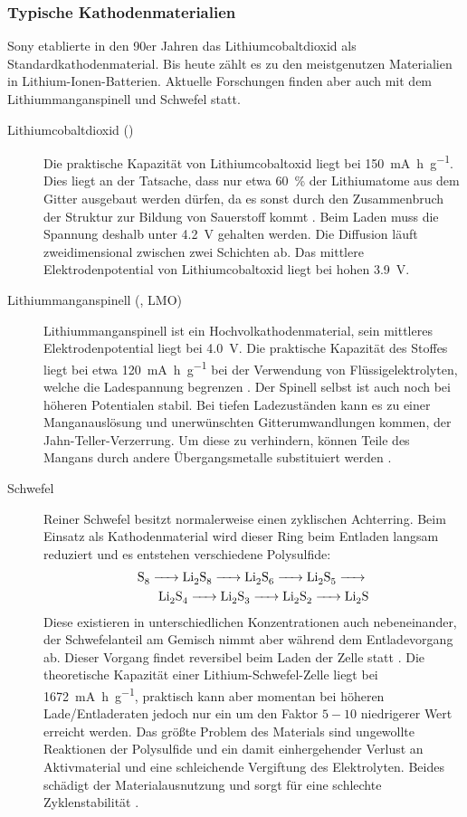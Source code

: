 \documentclass[a4paper, 11pt, headsepline,footsepline,twoside,abstract]{scrbook}
\begin{document}
\subsubsection{Typische Kathodenmaterialien}
Sony etablierte in den 90er Jahren das Lithiumcobaltdioxid als Standardkathodenmaterial. Bis heute zählt es zu den meistgenutzen Materialien in Lithium-Ionen-Batterien. Aktuelle Forschungen finden aber auch mit dem Lithiummanganspinell und Schwefel statt.
\begin{description}
\item[Lithiumcobaltdioxid ()] Die praktische Kapazität von Lithiumcobaltoxid liegt bei \SI{150}{\milli\ampere\hour\per\gram}. Dies liegt an der Tatsache, dass nur etwa \SI{60}{\percent} der Lithiumatome aus dem Gitter ausgebaut werden dürfen, da es sonst durch den Zusammenbruch der Struktur zur Bildung von Sauerstoff kommt \cite{jossen_2006}. Beim Laden muss die Spannung deshalb unter \SI{4.2}{\volt} gehalten werden. Die Diffusion läuft zweidimensional zwischen zwei Schichten ab. Das mittlere Elektrodenpotential von Lithiumcobaltoxid liegt bei hohen \SI{3.9}{\volt}.
\item[Lithiummanganspinell (, LMO)] Lithiummanganspinell ist ein Hochvolkathodenmaterial, sein mittleres Elektrodenpotential liegt bei \SI{4.0}{\volt}. Die praktische Kapazität des Stoffes liegt bei etwa \SI{120}{\milli\ampere\hour\per\gram} bei der Verwendung von Flüssigelektrolyten, welche die Ladespannung  begrenzen \cite{Wang2008developments}. Der Spinell selbst ist auch noch bei höheren Potentialen stabil. Bei tiefen Ladezuständen kann es zu einer Manganauslösung und unerwünschten Gitterumwandlungen kommen, der Jahn-Teller-Verzerrung. Um diese zu verhindern, können Teile des Mangans durch andere Übergangsmetalle substituiert werden \cite{bhaskar20143d}.
\item[Schwefel] Reiner Schwefel besitzt normalerweise einen zyklischen Achterring. Beim Einsatz als Kathodenmaterial wird dieser Ring beim Entladen langsam reduziert und es entstehen verschiedene Polysulfide:
\begin{equation}
\begin{split}
\ce{S8 -> Li2S8 -> Li2S6 -> Li2S5 -> }\\
\ce{ Li2S4 -> Li2S3 -> Li2S2 -> Li2S}
\end{split}
\end{equation}
Diese existieren in unterschiedlichen Konzentrationen auch nebeneinander, der Schwefelanteil am Gemisch nimmt aber während dem Entladevorgang ab. Dieser Vorgang findet reversibel beim Laden der Zelle statt \cite{zhang2013liquid}. Die theoretische Kapazität einer Lithium-Schwefel-Zelle liegt bei \SI{1672}{\milli\ampere\hour\per\gram}, praktisch kann aber momentan bei höheren Lade/Entladeraten jedoch nur ein um den Faktor $5-10$ niedrigerer Wert erreicht werden. Das größte Problem des Materials sind ungewollte Reaktionen der Polysulfide und ein damit einhergehender Verlust an Aktivmaterial und eine schleichende Vergiftung des Elektrolyten. Beides schädigt der Materialausnutzung und sorgt für eine schlechte Zyklenstabilität \cite{manthiram2012challenges}.
\end{description}
\end{document}
